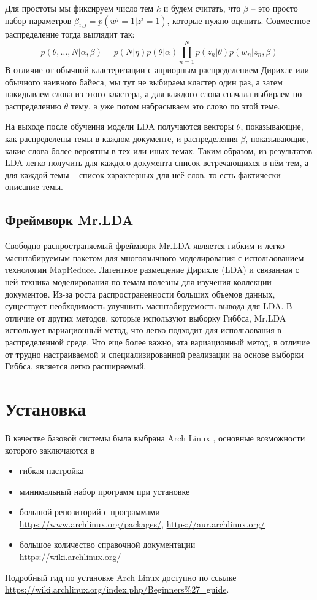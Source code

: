 Для простоты мы фиксируем число тем \( k \) и будем считать, что \( \beta \) -- это просто набор параметров 
\( \beta_{i,j} = p(w^j = 1 | z^i = 1)\), которые нужно оценить. Совместное распределение тогда выглядит так:
\[
    p(\theta,\ldots,N|\alpha,\beta) = 
        p(N|\eta)p(\theta|\alpha)\prod\limits_{n=1}^{N}p(z_n|\theta)p(w_n|z_n,\beta)
\]
В отличие от обычной кластеризации с априорным распределением Дирихле или обычного наивного байеса, мы тут 
не выбираем кластер один раз, а затем накидываем слова из этого кластера, а для каждого слова сначала 
выбираем по распределению \( \theta \) тему, а уже потом набрасываем это слово по этой теме.

На выходе после обучения модели LDA получаются векторы \( \theta \), показывающие, как распределены темы в 
каждом документе, и распределения \( \beta \), показывающие, какие слова более вероятны в тех или иных 
темах. Таким образом, из результатов LDA легко получить для каждого документа список встречающихся в нём 
тем, а для каждой темы -- список характерных для неё слов, то есть фактически описание темы.\cite{lda}

\subsection{Фреймворк Mr.LDA}
Свободно распространяемый фреймворк Mr.LDA является гибким и легко масштабируемым пакетом для многоязычного 
моделирования с использованием технологии MapReduce. Латентное размещение Дирихле (LDA) и связанная с ней 
техника моделирования по темам полезны для изучения коллекции документов. Из-за роста распространенности 
больших объемов данных, существует необходимость улучшить масштабируемость вывода для LDA. В отличие от 
других методов, которые используют выборку Гиббса, Mr.LDA использует вариационный метод, что легко подходит 
для использования в распределенной среде. Что еще более важно, эта вариационный метод, в отличие от 
трудно настраиваемой и специализированной реализации на основе выборки Гиббса, является легко расширяемый.
\cite{mrldainfo}

\newpage

\section{Установка}
В качестве базовой системы была выбрана Arch Linux \cite{arch}, основные возможности которого заключаются в 
\begin{itemize}
    \item гибкая настройка
    \item минимальный набор программ при установке
    \item большой репозиторий с программами \\
        \url{https://www.archlinux.org/packages/}, \url{https://aur.archlinux.org/}
    \item большое количество справочной документации\\
        \url{https://wiki.archlinux.org/}
\end{itemize}
Подробный гид по установке Arch Linux доступно по ссылке\\
\url{https://wiki.archlinux.org/index.php/Beginners%27_guide}.

